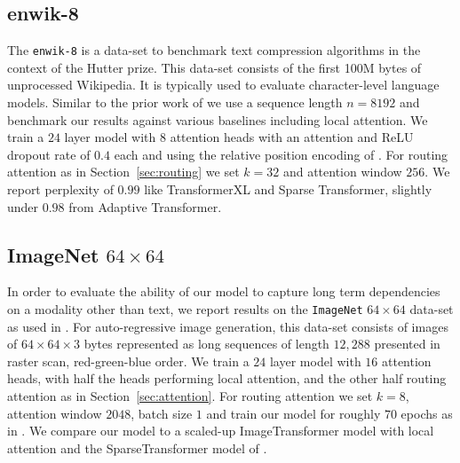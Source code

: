 \documentclass[a4paper]{article}
\begin{document}
\subsection{enwik-8}
The \texttt{enwik-8} \citep{mahoney2011large}
is a data-set to benchmark text compression 
algorithms in the context of the Hutter prize. This data-set
consists of the first 100M bytes of unprocessed Wikipedia.
It is typically used to evaluate character-level language models.
Similar to the prior work of \citet{dai2019transformer, child2019generating}
we use a sequence length \(n = 8192\) and benchmark our results
against various baselines including local attention.
We train a \(24\) layer model with \(8\) attention heads with an
attention and ReLU dropout rate of \(0.4\) each and using the relative
position encoding of \citet{shaw2018self}. For routing
attention as in Section~\ref{sec:routing} we set \(k = 32\) 
and attention window \(256\). We report perplexity of $0.99$ like 
TransformerXL and Sparse Transformer, slightly under $0.98$ from 
Adaptive Transformer. 

\subsection{ImageNet \(64\times 64\)}
In order to evaluate the ability of our model to capture long term
dependencies on a modality other than text, we report results on
the \texttt{ImageNet} \(64\times 64\) data-set as used in \citet{child2019generating}.
For auto-regressive image generation, this data-set consists of images of 
$64\times 64 \times 3$ bytes represented as long sequences of length $12,288$ 
presented in raster scan, red-green-blue order.
We train a \(24\) layer model with \(16\) attention heads, with half
the heads performing local attention, and the other half routing
attention as in Section~\ref{sec:attention}. For routing attention
we set \(k = 8\), attention window \(2048\), batch size \(1\) 
and train our model for roughly \(70\) epochs as in 
\citet{child2019generating}. We compare
our model to a scaled-up ImageTransformer model with local attention \citep{parmar2018image}
and the SparseTransformer model of \citet{child2019generating}.
\end{document}
